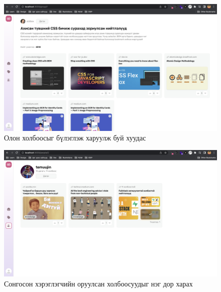 \begin{figure}[h]
	\centering
	\includegraphics[width=13cm]{images/implement/group-link.png}
	\caption{Олон холбоосыг бүлэглэж харуулж буй хуудас}
	\label{fig:group-link}
\end{figure}

\begin{figure}[h]
	\centering
	\includegraphics[width=13cm]{images/implement/user-posts.png}
	\caption{Сонгосон хэрэглэгчийн оруулсан холбоосуудыг нэг дор харах}
	\label{fig:user-posts}
\end{figure}
